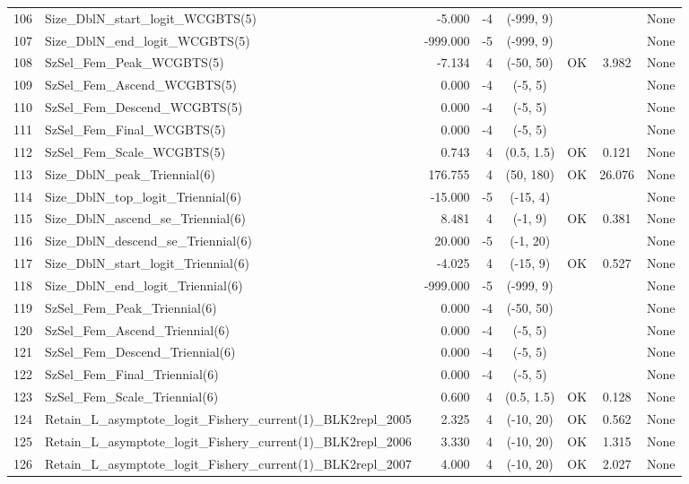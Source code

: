 \documentclass[12pt,]{article}
\begin{document}
\begin{landscape}
\begin{longtable}{rlrrcccl}
  106 & Size\_DblN\_start\_logit\_WCGBTS(5) & -5.000 & -4 & (-999, 9) &  &  & None \\ 
  107 & Size\_DblN\_end\_logit\_WCGBTS(5) & -999.000 & -5 & (-999, 9) &  &  & None \\ 
  108 & SzSel\_Fem\_Peak\_WCGBTS(5) & -7.134 & 4 & (-50, 50) & OK & 3.982 & None \\ 
  109 & SzSel\_Fem\_Ascend\_WCGBTS(5) & 0.000 & -4 & (-5, 5) &  &  & None \\ 
  110 & SzSel\_Fem\_Descend\_WCGBTS(5) & 0.000 & -4 & (-5, 5) &  &  & None \\ 
  111 & SzSel\_Fem\_Final\_WCGBTS(5) & 0.000 & -4 & (-5, 5) &  &  & None \\ 
  112 & SzSel\_Fem\_Scale\_WCGBTS(5) & 0.743 & 4 & (0.5, 1.5) & OK & 0.121 & None \\ 
  113 & Size\_DblN\_peak\_Triennial(6) & 176.755 & 4 & (50, 180) & OK & 26.076 & None \\ 
  114 & Size\_DblN\_top\_logit\_Triennial(6) & -15.000 & -5 & (-15, 4) &  &  & None \\ 
  115 & Size\_DblN\_ascend\_se\_Triennial(6) & 8.481 & 4 & (-1, 9) & OK & 0.381 & None \\ 
  116 & Size\_DblN\_descend\_se\_Triennial(6) & 20.000 & -5 & (-1, 20) &  &  & None \\ 
  117 & Size\_DblN\_start\_logit\_Triennial(6) & -4.025 & 4 & (-15, 9) & OK & 0.527 & None \\ 
  118 & Size\_DblN\_end\_logit\_Triennial(6) & -999.000 & -5 & (-999, 9) &  &  & None \\ 
  119 & SzSel\_Fem\_Peak\_Triennial(6) & 0.000 & -4 & (-50, 50) &  &  & None \\ 
  120 & SzSel\_Fem\_Ascend\_Triennial(6) & 0.000 & -4 & (-5, 5) &  &  & None \\ 
  121 & SzSel\_Fem\_Descend\_Triennial(6) & 0.000 & -4 & (-5, 5) &  &  & None \\ 
  122 & SzSel\_Fem\_Final\_Triennial(6) & 0.000 & -4 & (-5, 5) &  &  & None \\ 
  123 & SzSel\_Fem\_Scale\_Triennial(6) & 0.600 & 4 & (0.5, 1.5) & OK & 0.128 & None \\ 
  124 & Retain\_L\_asymptote\_logit\_Fishery\_current(1)\_BLK2repl\_2005 & 2.325 & 4 & (-10, 20) & OK & 0.562 & None \\ 
  125 & Retain\_L\_asymptote\_logit\_Fishery\_current(1)\_BLK2repl\_2006 & 3.330 & 4 & (-10, 20) & OK & 1.315 & None \\ 
  126 & Retain\_L\_asymptote\_logit\_Fishery\_current(1)\_BLK2repl\_2007 & 4.000 & 4 & (-10, 20) & OK & 2.027 & None \\ 

\end{longtable}
\end{landscape}
\end{document}
